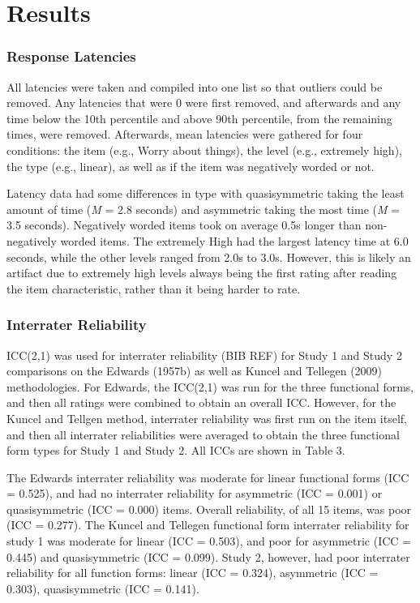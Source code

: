 \documentclass[
  ,jou]{apa6}
\begin{document}
\section{Results}\label{results-1}

\subsubsection{Response Latencies}\label{response-latencies}

All latencies were taken and compiled into one list so that outliers could be removed. Any latencies that were 0 were first removed, and afterwards and any time below the 10th percentile and above 90th percentile, from the remaining times, were removed. Afterwards, mean latencies were gathered for four conditions: the item (e.g., Worry about things), the level (e.g., extremely high), the type (e.g., linear), as well as if the item was negatively worded or not.

Latency data had some differences in type with quasisymmetric taking the least amount of time (\emph{M} = 2.8 seconds) and asymmetric taking the most time (\emph{M} = 3.5 seconds). Negatively worded items took on average 0.5s longer than non-negatively worded items. The extremely High had the largest latency time at 6.0 seconds, while the other levels ranged from 2.0s to 3.0s. However, this is likely an artifact due to extremely high levels always being the first rating after reading the item characteristic, rather than it being harder to rate.

\subsubsection{Interrater Reliability}\label{interrater-reliability}

ICC(2,1) was used for interrater reliability (BIB REF) for Study 1 and Study 2 comparisons on the Edwards (1957b) as well as Kuncel and Tellegen (2009) methodologies. For Edwards, the ICC(2,1) was run for the three functional forms, and then all ratings were combined to obtain an overall ICC. However, for the Kuncel and Tellgen method, interrater reliability was first run on the item itself, and then all interrater reliabilities were averaged to obtain the three functional form types for Study 1 and Study 2. All ICCs are shown in Table 3.

The Edwards interrater reliability was moderate for linear functional forms (ICC = 0.525), and had no interrater reliability for asymmetric (ICC = 0.001) or quasisymmetric (ICC = 0.000) items. Overall reliability, of all 15 items, was poor (ICC = 0.277). The Kuncel and Tellegen functional form interrater reliability for study 1 was moderate for linear (ICC = 0.503), and poor for asymmetric (ICC = 0.445) and quasisymmetric (ICC = 0.099). Study 2, however, had poor interrater reliability for all function forms: linear (ICC = 0.324), asymmetric (ICC = 0.303), quasisymmetric (ICC = 0.141).
\end{document}
